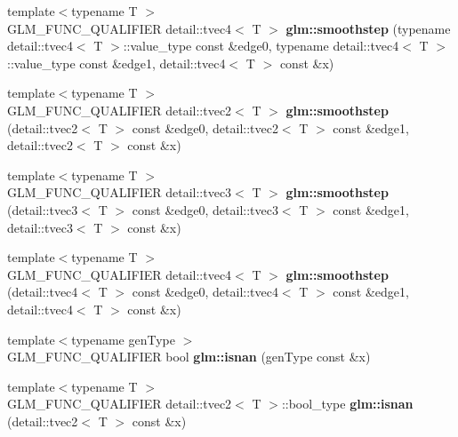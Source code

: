 \begin{DoxyCompactItemize}
\item 
\hypertarget{namespaceglm_a17525ba6123f56066046fe07b127e006}{{\footnotesize template$<$typename T $>$ }\\\-G\-L\-M\-\_\-\-F\-U\-N\-C\-\_\-\-Q\-U\-A\-L\-I\-F\-I\-E\-R \*
detail\-::tvec4$<$ \-T $>$ {\bfseries glm\-::smoothstep} (typename detail\-::tvec4$<$ \-T $>$\-::value\-\_\-type const \&edge0, typename detail\-::tvec4$<$ \-T $>$\-::value\-\_\-type const \&edge1, detail\-::tvec4$<$ \-T $>$ const \&x)}\label{namespaceglm_a17525ba6123f56066046fe07b127e006}

\item 
\hypertarget{namespaceglm_af602ff787e99445553837e916d4268f8}{{\footnotesize template$<$typename T $>$ }\\\-G\-L\-M\-\_\-\-F\-U\-N\-C\-\_\-\-Q\-U\-A\-L\-I\-F\-I\-E\-R \*
detail\-::tvec2$<$ \-T $>$ {\bfseries glm\-::smoothstep} (detail\-::tvec2$<$ \-T $>$ const \&edge0, detail\-::tvec2$<$ \-T $>$ const \&edge1, detail\-::tvec2$<$ \-T $>$ const \&x)}\label{namespaceglm_af602ff787e99445553837e916d4268f8}

\item 
\hypertarget{namespaceglm_ae5221c42b168a958dcc60b053d8610c1}{{\footnotesize template$<$typename T $>$ }\\\-G\-L\-M\-\_\-\-F\-U\-N\-C\-\_\-\-Q\-U\-A\-L\-I\-F\-I\-E\-R \*
detail\-::tvec3$<$ \-T $>$ {\bfseries glm\-::smoothstep} (detail\-::tvec3$<$ \-T $>$ const \&edge0, detail\-::tvec3$<$ \-T $>$ const \&edge1, detail\-::tvec3$<$ \-T $>$ const \&x)}\label{namespaceglm_ae5221c42b168a958dcc60b053d8610c1}

\item 
\hypertarget{namespaceglm_a76ad1cbce32a29bc7eb7d6c2a3a30330}{{\footnotesize template$<$typename T $>$ }\\\-G\-L\-M\-\_\-\-F\-U\-N\-C\-\_\-\-Q\-U\-A\-L\-I\-F\-I\-E\-R \*
detail\-::tvec4$<$ \-T $>$ {\bfseries glm\-::smoothstep} (detail\-::tvec4$<$ \-T $>$ const \&edge0, detail\-::tvec4$<$ \-T $>$ const \&edge1, detail\-::tvec4$<$ \-T $>$ const \&x)}\label{namespaceglm_a76ad1cbce32a29bc7eb7d6c2a3a30330}

\item 
\hypertarget{namespaceglm_aeeb2087d319189cede0655a50a0b7675}{{\footnotesize template$<$typename gen\-Type $>$ }\\\-G\-L\-M\-\_\-\-F\-U\-N\-C\-\_\-\-Q\-U\-A\-L\-I\-F\-I\-E\-R bool {\bfseries glm\-::isnan} (gen\-Type const \&x)}\label{namespaceglm_aeeb2087d319189cede0655a50a0b7675}

\item 
\hypertarget{namespaceglm_a267a9851957896d360a7b9168897390e}{{\footnotesize template$<$typename T $>$ }\\\-G\-L\-M\-\_\-\-F\-U\-N\-C\-\_\-\-Q\-U\-A\-L\-I\-F\-I\-E\-R \*
detail\-::tvec2$<$ \-T $>$\-::bool\-\_\-type {\bfseries glm\-::isnan} (detail\-::tvec2$<$ \-T $>$ const \&x)}\label{namespaceglm_a267a9851957896d360a7b9168897390e}


\end{DoxyCompactItemize}
